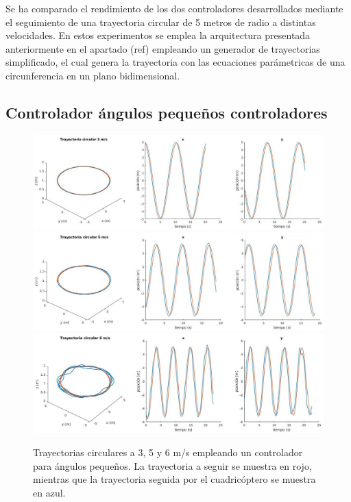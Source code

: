 Se ha comparado el rendimiento de los dos controladores desarrollados mediante el seguimiento de una trayectoria circular de 5 metros de radio a distintas velocidades. En estos experimentos se emplea la arquitectura presentada anteriormente en el apartado \tb(ref) empleando un generador de trayectorias simplificado, el cual genera la trayectoria con las ecuaciones parámetricas de una circunferencia en un plano bidimensional.

\subsection{Controlador ángulos pequeños controladores}


\begin{figure}[htb!]
	\centering
	\includegraphics[width=\textwidth]{imagenes/circle3ms}
	\includegraphics[width=\textwidth]{imagenes/circle5ms}
	\includegraphics[width=\textwidth]{imagenes/circle6ms}
	\caption{Trayectorias circulares a 3, 5 y 6 m/s empleando un controlador para ángulos pequeños. La trayectoria a seguir se muestra en rojo, mientras que la trayectoria seguida por el cuadricóptero se muestra en azul.}	\label{circle:slow}
\end{figure}
\newpage
